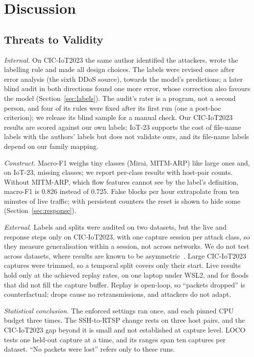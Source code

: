 \section{Discussion}\label{sec:discussion}

\subsection{Threats to Validity}\label{sec:threats}

\emph{Internal.} On CIC-IoT2023 the same author identified the attackers, wrote the labelling rule and made all design choices. The labels were revised once after error analysis (the sixth DDoS source), towards the model's predictions; a later blind audit in both directions found one more error, whose correction also favours the model (Section~\ref{sec:labels}). The audit's rater is a program, not a second person, and four of its rules were fixed after its first run (one a post-hoc criterion); we release its blind sample for a manual check. Our CIC-IoT2023 results are scored against our own labels; IoT-23 supports the cost of file-name labels with the authors' labels but does not validate ours, and its file-name labels depend on our family mapping.

\emph{Construct.} Macro-F1 weighs tiny classes (Mirai, MITM-ARP) like large ones and, on IoT-23, missing classes; we report per-class results with host-pair counts. Without MITM-ARP, which flow features cannot see by the label's definition, macro-F1 is 0.826 instead of 0.725. False blocks per hour extrapolate from ten minutes of live traffic; with persistent counters the reset is shown to hide some (Section~\ref{sec:response}).

\emph{External.} Labels and splits were audited on two datasets, but the live and response steps only on CIC-IoT2023, with one capture session per attack class, so they measure generalisation within a session, not across networks. We do not test across datasets, where results are known to be asymmetric~\cite{ali2026siamxbert}. Large CIC-IoT2023 captures were trimmed, so a temporal split covers only their start. Live results hold only at the achieved replay rates, on one laptop under WSL2, and for floods that did not fill the capture buffer. Replay is open-loop, so ``packets dropped'' is counterfactual: drops cause no retransmissions, and attackers do not adapt.

\emph{Statistical conclusion.} The enforced settings ran once, and each pinned CPU budget three times. The SSH-to-RTSP change rests on three host pairs, and the CIC-IoT2023 gap beyond it is small and not established at capture level. LOCO tests one held-out capture at a time, and its ranges span ten captures per dataset. ``No packets were lost'' refers only to these runs.

